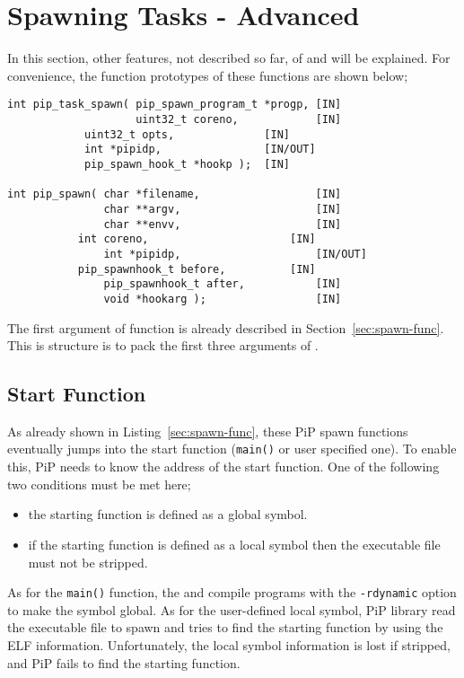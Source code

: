 
\section{Spawning Tasks - Advanced}\label{sec:spawn-adv}

In this section, other features, not described so far, of
 and  will be
explained. For convenience, the function prototypes of these functions
are shown below;

\begin{lstlisting}[frame=tb]
int pip_task_spawn( pip_spawn_program_t *progp, [IN]
                    uint32_t coreno,            [IN]
		    uint32_t opts,              [IN]
		    int *pipidp,                [IN/OUT]
		    pip_spawn_hook_t *hookp );  [IN]

int pip_spawn( char *filename,                  [IN]
               char **argv,                     [IN]
               char **envv,                     [IN]
	       int coreno,                      [IN]
               int *pipidp,                     [IN/OUT]
	       pip_spawnhook_t before,          [IN]
               pip_spawnhook_t after,           [IN]
               void *hookarg );                 [IN]
\end{lstlisting}

The first argument of  function is already
described in Section~\ref{sec:spawn-func}. This is structure is to
pack the first three arguments of . 

\subsection{Start Function}

As already shown in Listing~\ref{sec:spawn-func}, these PiP spawn
functions eventually jumps into the start function ({\tt main()} or
user specified one). To enable this, PiP needs to know the address of
the start function. One of the following two conditions must be
met here;

\begin{itemize}
\item the starting function is defined as a global symbol.
\item if the starting function is defined as a local symbol then the
  executable file must not be stripped.
\end{itemize}

As for the {\tt main()} function, the  and
 compile programs with the {\tt -rdynamic} option to
make the symbol global. As for the user-defined local symbol, PiP
library read the executable file to spawn and tries to find the
starting function by using the ELF information. Unfortunately, the
local symbol information is lost if stripped, and PiP fails to find
the starting function.

